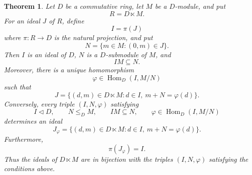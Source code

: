 \documentclass[10pt,a4paper]{amsart}
\newtheorem{theorem}{Theorem}
\newcommand{\Hom}{\operatorname{Hom}}
\begin{document}
	\begin{theorem}
		\label{thm:classification}
		Let $D$ be a commutative ring, let $M$ be a $D$-module, and put
		\[
		R=D\ltimes M.
		\]
		For an ideal $J$ of $R$, define
		\[
		I=\pi(J)
		\]
		where $\pi:R\to D$ is the natural projection, and put
		\[
		N=\{m\in M:(0,m)\in J\}.
		\]
		Then $I$ is an ideal of $D$, $N$ is a $D$-submodule of $M$, and
		\[
		IM\subseteq N.
		\]
		Moreover, there is a unique homomorphism
		\[
		\varphi\in\Hom_D(I,M/N)
		\]
		such that
		\[
		J
		=
		\{(d,m)\in D\ltimes M:
		d\in I,\ m+N=\varphi(d)\}.
		\]
		Conversely, every triple $(I,N,\varphi)$ satisfying
		\[
		I\lhd D,\qquad N\leq_D M,\qquad IM\subseteq N,
		\qquad
		\varphi\in\Hom_D(I,M/N)
		\]
		determines an ideal
		\[
		J_\varphi
		=
		\{(d,m)\in D\ltimes M:
		d\in I,\ m+N=\varphi(d)\}.
		\]
		Furthermore,
		\[
		\pi(J_\varphi)=I.
		\]
		Thus the ideals of $D\ltimes M$ are in bijection with the triples
		$(I,N,\varphi)$ satisfying the conditions above.
	\end{theorem}
\end{document}
